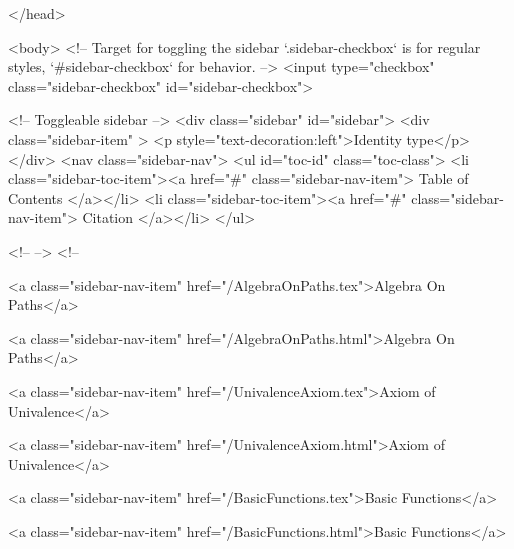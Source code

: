   
</head>




  <body>
    <!-- Target for toggling the sidebar `.sidebar-checkbox` is for regular
     styles, `#sidebar-checkbox` for behavior. -->
<input type="checkbox" class="sidebar-checkbox" id="sidebar-checkbox">

<!-- Toggleable sidebar -->
<div class="sidebar" id="sidebar">
  <div class="sidebar-item" >
    <p style="text-decoration:left">Identity type</p>
  </div>
  <nav class="sidebar-nav">
    <ul id="toc-id" class="toc-class">
  <li class="sidebar-toc-item"><a href="#" class="sidebar-nav-item"> Table of Contents </a></li>
  <li class="sidebar-toc-item"><a href="#" class="sidebar-nav-item"> Citation </a></li>
</ul>


    <!--  -->
    <!-- 
      
    
      
    
      
    
      
        
      
    
      
        
          <a class="sidebar-nav-item" href="/AlgebraOnPaths.tex">Algebra On Paths</a>
        
      
    
      
        
          <a class="sidebar-nav-item" href="/AlgebraOnPaths.html">Algebra On Paths</a>
        
      
    
      
        
          <a class="sidebar-nav-item" href="/UnivalenceAxiom.tex">Axiom of Univalence</a>
        
      
    
      
        
          <a class="sidebar-nav-item" href="/UnivalenceAxiom.html">Axiom of Univalence</a>
        
      
    
      
        
          <a class="sidebar-nav-item" href="/BasicFunctions.tex">Basic Functions</a>
        
      
    
      
        
          <a class="sidebar-nav-item" href="/BasicFunctions.html">Basic Functions</a>
        
      
    
      
        
